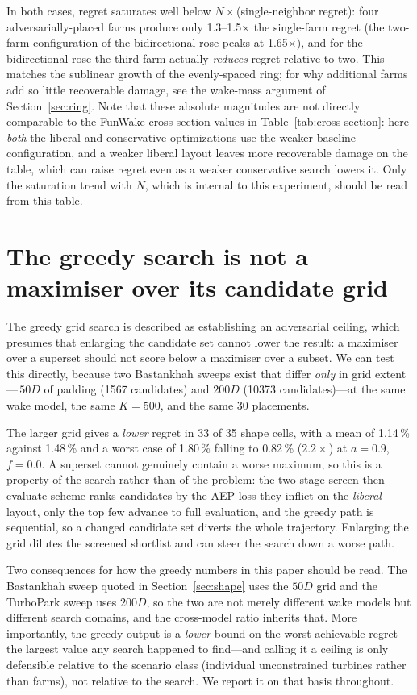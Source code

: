 \documentclass[wes, manuscript]{copernicus}
\begin{document}
In both cases, regret saturates well below $N \times$(single-neighbor regret): four adversarially-placed farms produce only 1.3--1.5$\times$ the single-farm regret (the two-farm configuration of the bidirectional rose peaks at 1.65$\times$), and for the bidirectional rose the third farm actually \emph{reduces} regret relative to two.
This matches the sublinear growth of the evenly-spaced ring; for why additional farms add so little recoverable damage, see the wake-mass argument of Section~\ref{sec:ring}.
Note that these absolute magnitudes are not directly comparable to the FunWake cross-section values in Table~\ref{tab:cross-section}: here \emph{both} the liberal and conservative optimizations use the weaker baseline configuration, and a weaker liberal layout leaves more recoverable damage on the table, which can raise regret even as a weaker conservative search lowers it.
Only the saturation trend with $N$, which is internal to this experiment, should be read from this table.

\section{The greedy search is not a maximiser over its candidate grid}\label{app:gridextent}

The greedy grid search is described as establishing an adversarial ceiling, which presumes that enlarging the candidate set cannot lower the result: a maximiser over a superset should not score below a maximiser over a subset.
We can test this directly, because two Bastankhah sweeps exist that differ \emph{only} in grid extent---\,$50D$ of padding (1567 candidates) and $200D$ (10373 candidates)---at the same wake model, the same $K = 500$, and the same 30 placements.

The larger grid gives a \emph{lower} regret in 33 of 35 shape cells, with a mean of 1.14\,\% against 1.48\,\% and a worst case of 1.80\,\% falling to 0.82\,\% ($2.2\times$) at $a = 0.9$, $f = 0.0$.
A superset cannot genuinely contain a worse maximum, so this is a property of the search rather than of the problem: the two-stage screen-then-evaluate scheme ranks candidates by the AEP loss they inflict on the \emph{liberal} layout, only the top few advance to full evaluation, and the greedy path is sequential, so a changed candidate set diverts the whole trajectory.
Enlarging the grid dilutes the screened shortlist and can steer the search down a worse path.

Two consequences for how the greedy numbers in this paper should be read.
The Bastankhah sweep quoted in Section~\ref{sec:shape} uses the $50D$ grid and the TurboPark sweep uses $200D$, so the two are not merely different wake models but different search domains, and the cross-model ratio inherits that.
More importantly, the greedy output is a \emph{lower} bound on the worst achievable regret---the largest value any search happened to find---and calling it a ceiling is only defensible relative to the scenario class (individual unconstrained turbines rather than farms), not relative to the search.
We report it on that basis throughout.
\end{document}
